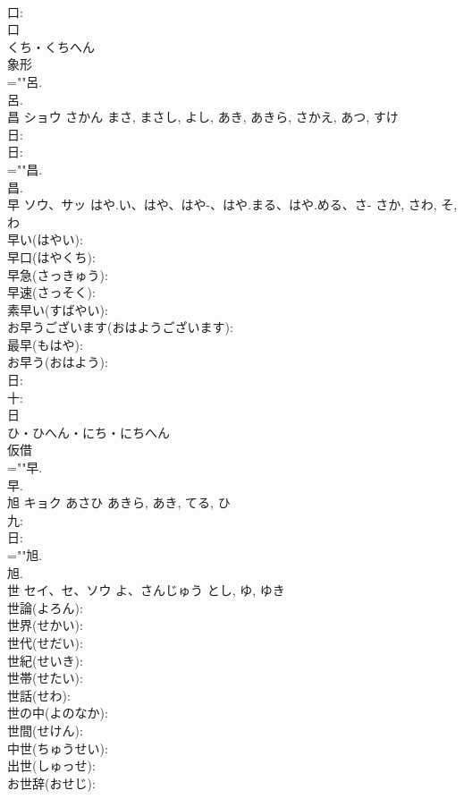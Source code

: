 \documentclass[8pt]{extreport}
\begin{document}
\begin{CJK}{UTF8}{min}
\\	口: 
\\	口	
\\	くち・くちへん	
\\	象形 
\\	=""呂.
\\	呂.
\\	昌	ショウ	さかん	まさ, まさし, よし, あき, あきら, さかえ, あつ, すけ	
\\	日: 
\\	日: 
\\	=""昌.
\\	昌.
\\	早	ソウ、サッ	はや.い、はや、はや-、はや.まる、はや.める、さ-	さか, さわ, そ, わ	
\\	早い(はやい): 
\\	早口(はやくち): 
\\	早急(さっきゅう): 
\\	早速(さっそく): 
\\	素早い(すばやい): 
\\	お早うございます(おはようございます): 
\\	最早(もはや): 
\\	お早う(おはよう): 
\\	日: 
\\	十: 
\\	日	
\\	ひ・ひへん・にち・にちへん	
\\	仮借 
\\	=""早.
\\	早.
\\	旭	キョク	あさひ	あきら, あき, てる, ひ	
\\	九: 
\\	日: 
\\	=""旭.
\\	旭.
\\	世	セイ、セ、ソウ	よ、さんじゅう	とし, ゆ, ゆき	
\\	世論(よろん): 
\\	世界(せかい): 
\\	世代(せだい): 
\\	世紀(せいき): 
\\	世帯(せたい): 
\\	世話(せわ): 
\\	世の中(よのなか): 
\\	世間(せけん): 
\\	中世(ちゅうせい): 
\\	出世(しゅっせ): 
\\	お世辞(おせじ): 

\end{CJK}
\end{document}
